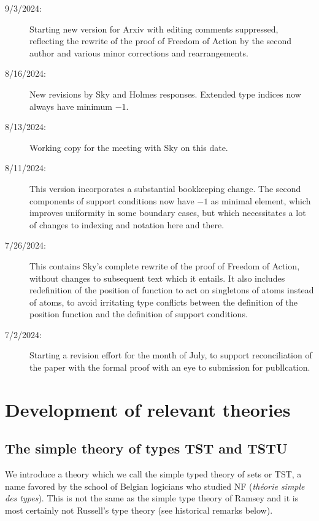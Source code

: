 \documentclass[112pt]{article}
\theoremstyle{definition}
\theoremstyle{remark}
\begin{document}
\begin{description}
\item[9/3/2024:]  Starting new version for Arxiv with editing comments suppressed, reflecting the rewrite of the proof of Freedom of Action by the second author and various minor corrections and rearrangements.

\item[8/16/2024:]  New revisions by Sky and Holmes responses.  Extended type indices now always have minimum $-1$.

\item[8/13/2024:]  Working copy for the meeting with Sky on this date.

\item[8/11/2024:]  This version incorporates a substantial bookkeeping change.  The second components of support conditions now have $-1$ as minimal element, which improves uniformity in some boundary cases, but which necessitates a lot of changes to indexing and notation here and there.

\item[7/26/2024:]  This contains Sky's complete rewrite of the proof of Freedom of Action, without changes to subsequent text which it entails.  It also includes
redefinition of the position of function to act on singletons of atoms instead of atoms, to avoid irritating type conflicts between the definition of the position function
and the definition of support conditions.

\item[7/2/2024:]  Starting a revision effort for the month of July, to support reconciliation of the paper with the formal proof with an eye to submission for publlcation.

\end{description}


\newpage

\section{Development of relevant theories}



\subsection{The simple theory of types TST and TSTU}

We introduce a theory which we call the simple typed theory of sets or TST, a name favored by the school of Belgian logicians who studied NF ({\em th\'eorie simple des types}).  This is not the same as the simple type theory of Ramsey and it is most certainly not Russell's type theory  (see historical remarks below).
\end{document}
